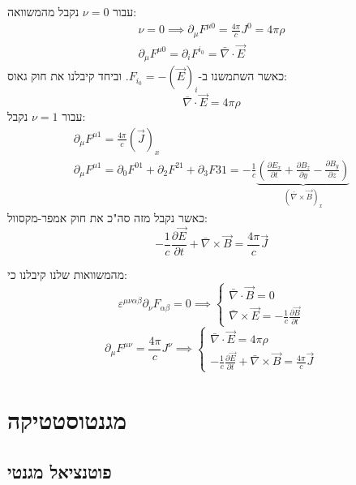\documentclass{tstextbook}
\begin{document}
עבור \(\nu=0\) נקבל מהמשוואה:
$$\begin{gather}\nu=0\implies \partial_{\mu} F^{\mu 0}= \frac{4\pi}{c}J^0=4\pi \rho  \\\partial_{\mu}F^{\mu 0}=\partial_{i} F^{i_{0}}= \bar{\nabla} \cdot \vec{E}
\end{gather}$$
כאשר השתמשנו ב-\(F_{i_{0}}=-\left( \vec{E} \right)_{i}\). וביחד קיבלנו את חוק גאוס:
$$\bar{\nabla} \cdot \vec{E}=4\pi \rho$$
עבור \(\nu=1\) נקבל:
$$\begin{gather}\partial_{\mu}F^{\mu 1}=\frac{4\pi}{c}\left( \vec{J} \right)_{x}  \\\partial_{\mu} F^{\mu 1} = \partial_{0} F^{01}+\partial_{2} F^{21}+\partial_{3}F{31}=-\frac{1}{c}\underbrace{ \left( \frac{\partial E_{x}}{\partial t} +\frac{\partial B_{z}}{\partial y} -\frac{\partial B_{y}}{\partial z}  \right) }_{ \left( \bar{\nabla} \times \vec{B} \right)_{x} }
\end{gather}$$
כאשר נקבל מזה סה"כ את חוק אמפר-מקסוול:
$$-\frac{1}{c}\frac{\partial \vec{E}}{\partial t} + \bar{\nabla} \times \vec{B} = \frac{4\pi}{c}\vec{J}$$

\begin{corollary}
מהמשוואות שלנו קיבלנו כי:
$$\varepsilon^{\mu \nu \alpha \beta}\partial_{\nu}F_{\alpha \beta}=0\implies \begin{cases}\bar{\nabla} \cdot \vec{B} = 0 \\\bar{\nabla} \times \vec{E} = -\frac{1}{c} \frac{\partial \vec{B}}{\partial t} 
\end{cases}$$$$\partial_{\mu}F^{\mu \nu}=\frac{4\pi}{c}J^{\nu}\implies\begin{cases} \bar{\nabla} \cdot \vec{E}=4\pi \rho \\-\frac{1}{c}\frac{\partial \vec{E}}{\partial t} + \bar{\nabla} \times \vec{B} = \frac{4\pi}{c}\vec{J} 
\end{cases}$$

\end{corollary}
\section{מגנטוסטטיקה}

\subsection{פוטנציאל מגנטי}
\end{document}
